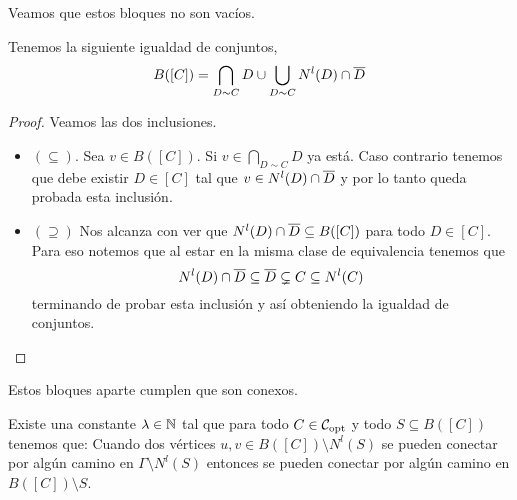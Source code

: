 \documentclass[tesis.tex]{subfiles}
\begin{document}
Veamos que estos bloques no son vacíos.

\begin{lema}
	Tenemos la siguiente igualdad de conjuntos,
	\[
		B([C]) = \bigcap_{D \sim C} D \cup \bigcup_{D \sim C} N^l(D) \cap \overline D
	\]
\end{lema}

\begin{proof}
	Veamos las dos inclusiones.
	
	\begin{itemize}
		\item \textbf{$(\subseteq)$}. 
		Sea $v \in B([C])$. 
		Si $v \in \bigcap_{D \sim C} D$ ya está. 
		Caso contrario tenemos que debe existir $D \in [C]$ tal que $v \in N^l(D) \cap \overline D$ y por lo tanto queda probada esta inclusión.
		\item \textbf{$(\supseteq)$} 
		Nos alcanza con ver que $ N^l(D) \cap \overline D \subseteq B([C])$ para todo $D \in [C]$.
		Para eso notemos que al estar en la misma clase de equivalencia tenemos que 
		\[
			N^l(D) \cap \overline D \subseteq \overline D \subsetneq C \subseteq N^l(C)
		\]
		terminando de probar esta inclusión y así obteniendo la igualdad de conjuntos.
	\end{itemize}
\end{proof}

Estos bloques aparte cumplen que son conexos.

\begin{lema}\label{lema_conexion_B(C)}
	Existe una constante $\lambda \in \mathbb{N}$ tal que para todo $C \in {\cal C}_{\text{opt}}$ y todo $S \subseteq B([C])$ tenemos que: 
	Cuando dos vértices $u,v \in B([C]) \setminus N^l(S)$ se pueden conectar por algún camino en $\Gamma \setminus N^l(S)$ entonces se pueden conectar por algún camino en $B([C]) \setminus S$. 
\end{lema}
\end{document}
